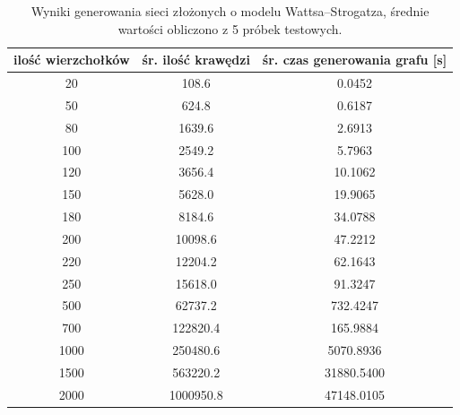 \documentclass[a4paper, 12pt, twoside, openright]{article}
\begin{document}
\begin{table}[!p]
	\centering
	\caption{Wyniki generowania sieci złożonych o modelu Wattsa–Strogatza, średnie wartości obliczono z 5 próbek testowych.}
	\resizebox{16cm}{!}
	{
		\begin{tabular}{|c c c|}
			\hline
			ilość wierzchołków	& śr. ilość krawędzi 		& śr. czas generowania grafu [s]\\ \hline \hline
			20 	& 108.6  		& 0.0452 	\\ \hline
			50 	& 624.8 		& 0.6187 	\\ \hline
			80 	& 1639.6        & 2.6913	\\ \hline
			100 & 2549.2        & 5.7963	\\ \hline
			120 & 3656.4        & 10.1062	\\ \hline
			150 & 5628.0   		& 19.9065	\\ \hline
			180 & 8184.6        & 34.0788	\\ \hline
			200 & 10098.6 		& 47.2212	\\ \hline
			220 & 12204.2 		& 62.1643	\\ \hline
			250 & 15618.0 		& 91.3247	\\ \hline
			500 & 62737.2 		& 732.4247	\\ \hline				
			700 & 122820.4      & 165.9884	\\ \hline
			1000& 250480.6	    & 5070.8936 \\ \hline
			1500& 563220.2	    & 31880.5400\\ \hline
			2000& 1000950.8    	& 47148.0105\\ \hline
		\end{tabular} 
	}
	\label{Tab:gen_WS}
\end{table}
\end{document}
